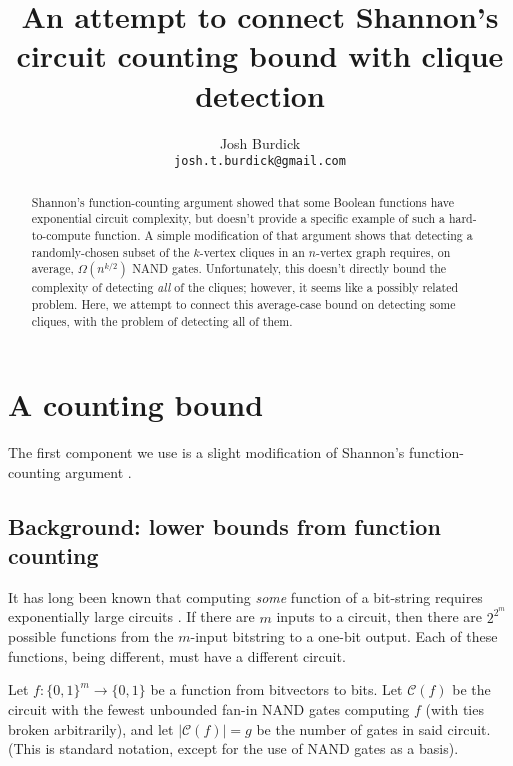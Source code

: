 \documentclass[12pt]{article}
\theoremstyle{definition}
\newcommand{\bigC}[0]{\mathcal{C}}
\begin{document}
\title{
An attempt to connect Shannon's
circuit counting bound with clique detection}

\author{Josh Burdick \\
{\tt josh.t.burdick@gmail.com}}
\maketitle

\begin{abstract}
Shannon's function-counting argument
\cite{shannon_synthesis_1949} showed that some Boolean functions have
exponential circuit complexity, but doesn't provide a specific example
of such a hard-to-compute function. A simple modification of that argument
shows that detecting a randomly-chosen subset of the $k$-vertex cliques in an
$n$-vertex graph requires, on average, $\Omega(n^{k/2})$ NAND gates.
Unfortunately,
this doesn't directly bound the complexity of detecting {\em all} of the cliques; however, it seems like a
possibly related problem.
Here, we attempt to connect this
average-case bound on detecting some
cliques, with the problem of detecting all of them.
\end{abstract}

\newpage

\tableofcontents

\section{A counting bound}
\label{countingBound}

The first component we use is a slight modification
of Shannon's function-counting argument
\cite{shannon_synthesis_1949}.

\subsection{Background: lower bounds from function counting}

It has long been known that computing {\em some} function of a bit-string
requires exponentially large circuits \cite{shannon_synthesis_1949}.
If there are $m$ inputs to a circuit,
then there are $2^{2^m}$ possible functions from the $m$-input bitstring to
a one-bit output. Each of these functions, being different, must have a
different circuit.

Let $f: \{0,1\}^m \rightarrow \{0,1\}$ be a function from bitvectors to bits.
Let $\bigC(f)$ be the circuit
with the fewest unbounded fan-in NAND
gates computing $f$ (with ties broken
arbitrarily), and let $|\bigC(f)| = g$ be the number of gates in
said circuit. (This is standard notation, except for the use
of NAND gates as a basis). 
\end{document}
